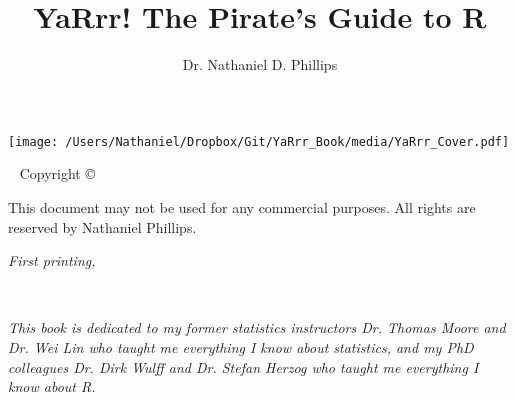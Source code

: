 \documentclass{tufte-book}\usepackage[]{graphicx}\usepackage[]{color}
\title{YaRrr! The Pirate's Guide to R}
\author{Dr. Nathaniel D. Phillips}
\begin{document}
\begin{center}
\texttt{[image: /Users/Nathaniel/Dropbox/Git/YaRrr\_Book/media/YaRrr\_Cover.pdf]}
\end{center}



\frontmatter

\maketitle


\newpage
\begin{fullwidth}
~\vfill
\thispagestyle{empty}
\setlength{\parindent}{0pt}
\setlength{\parskip}{\baselineskip}
Copyright \copyright\ \the\year\ \thanklessauthor

\par{}

\par{}

\par This document may not be used for any commercial purposes. All rights are reserved by Nathaniel Phillips.

\par\textit{First printing, \monthyear}
\end{fullwidth}


\tableofcontents %






\cleardoublepage
~\vfill
\begin{doublespace}
\noindent\fontsize{18}{22}\selectfont\itshape
\nohyphenation
This book is dedicated to my former statistics instructors Dr. Thomas Moore and Dr. Wei Lin who taught me everything I know about statistics, and my PhD colleagues Dr. Dirk Wulff and Dr. Stefan Herzog who taught me everything I know about R.
\end{doublespace}
\vfill
\end{document}
